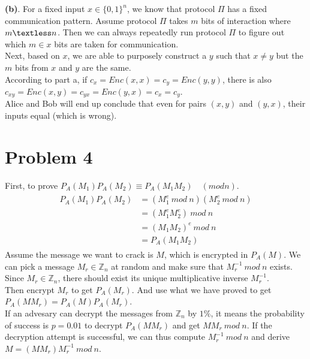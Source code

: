 \documentclass[titlepage, paper=a4, fontsize=11pt]{scrartcl} %
\numberwithin{equation}{section} %
\numberwithin{figure}{section} %
\numberwithin{table}{section} %
\begin{document}
\textbf{(b)}. For a fixed input $x \in \{0,1\}^n$, we know that protocol $\Pi$ has a fixed communication pattern.
Assume protocol $\Pi$ takes $m$ bits of interaction where $m \textless n$.
Then we can always repeatedly run protocol $\Pi$ to figure out which $m \in x$ bits are taken for communication. \\

Next, based on $x$, we are able to purposely construct a $y$ such that $x \neq y$ but the $m$ bits from
$x$ and $y$ are the same. \\

According to part a, if $c_x=Enc(x,x)=c_y=Enc(y,y)$, there is also $c_{xy}=Enc(x,y)=c_{yx}=Enc(y,x)=c_x=c_y$. \\

Alice and Bob will end up conclude that even for pairs $(x,y)$ and $(y,x)$, their inputs equal (which is wrong).
\\



\section*{Problem 4}
First, to prove $P_A(M_1)P_A(M_2) \equiv P_A(M_1M_2) \quad (mod n)$.
\begin{align*} 
\begin{split}
P_A(M_1)P_A(M_2) &= (M_1^e \  mod \ n )(M_2^e \  mod \ n ) \\
&= (M_1^eM_2^e) \ mod \ n \\
&= (M_1M_2)^e \ mod \ n \\
&= P_A(M_1M_2)
\end{split}					
\end{align*}
Assume the message we want to crack is $M$, which is encrypted in $P_A(M)$.
We can pick a message $M_r \in \mathbb{Z}_n$ at random and make sure that $M_{r}^{-1} \ mod \ n$ exists.
Since $M_r \in \mathbb{Z}_n$, there should exist its unique multiplicative inverse $M_r^{-1}$. \\

Then encrypt $M_r$ to get $P_A(M_r)$. And use what we have proved to get
$P_A(MM_r) = P_A(M)P_A(M_r)$. \\

If an advesary can decrypt the messages from $\mathbb{Z}_n$ by $1\%$, it means the probability of success
is $p = 0.01$ to decrypt $P_A(MM_r)$ and get $MM_r \ mod \ n$. If the decryption attempt is successful,
we can thus compute $M_r^{-1} \ mod \ n$ and derive $M = (MM_r)M_r^{-1} \ mod \ n$. \\
\end{document}
